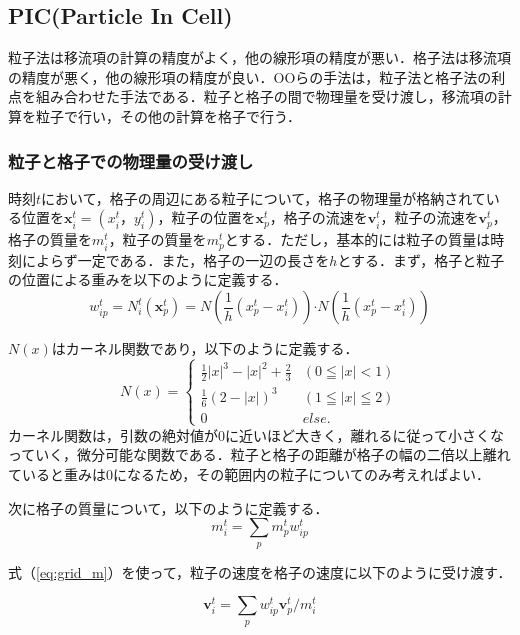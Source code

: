 \documentclass[a4j,12pt]{jreport}
\begin{document}
\subsection{PIC(Particle In Cell)} \label{subsec:PIC}
粒子法は移流項の計算の精度がよく，他の線形項の精度が悪い．格子法は移流項の精度が悪く，他の線形項の精度が良い．OOらの手法は，粒子法と格子法の利点を組み合わせた手法である．粒子と格子の間で物理量を受け渡し，移流項の計算を粒子で行い，その他の計算を格子で行う．
\subsubsection{粒子と格子での物理量の受け渡し} \label{subsec:P2GG2P}
時刻$t$において，格子の周辺にある粒子について，格子の物理量が格納されている位置を$\bm{x}^t_i = (x^t_i，y^t_i)$，粒子の位置を$\bm{x}^t_p$，格子の流速を$\bm{v}^t_i$，粒子の流速を$\bm{v}^t_p$，格子の質量を$m^t_i$，粒子の質量を$m^t_p$とする．ただし，基本的には粒子の質量は時刻によらず一定である．また，格子の一辺の長さを$h$とする．まず，格子と粒子の位置による重みを以下のように定義する．
\begin{equation}\label{eq:weight}
w^t_{ip} = N^t_i(\bm{x}^t_p) = N(\frac{1}{h}(x^t_p - x^t_i))\boldsymbol{\cdot}N(\frac{1}{h}(x^t_p - x^t_i))
\end{equation} 

$N(x)$はカーネル関数であり，以下のように定義する．
\begin{equation}\label{eq:kernel}
N(x) = 
\begin{cases}
\frac{1}{2}|x|^3 - |x|^2 + \frac{2}{3} & (0\leqq|x|<1) \\
\frac{1}{6}(2-|x|)^3 & (1\leqq|x|\leqq2) \\
0 & else.
\end{cases}
\end{equation} 
カーネル関数は，引数の絶対値が0に近いほど大きく，離れるに従って小さくなっていく，微分可能な関数である．粒子と格子の距離が格子の幅の二倍以上離れていると重みは0になるため，その範囲内の粒子についてのみ考えればよい．

次に格子の質量について，以下のように定義する．
\begin{equation}\label{eq:grid_m}
m^t_i = \sum\limits_p m^t_pw^t_{ip}
\end{equation} 

式（\ref{eq:grid_m}）を使って，粒子の速度を格子の速度に以下のように受け渡す．

\begin{equation}\label{eq:P2G}
\bm{v}^t_i = \sum\limits_p w^t_{ip}\bm{v}^t_p / m^t_i
\end{equation} 
\end{document}
